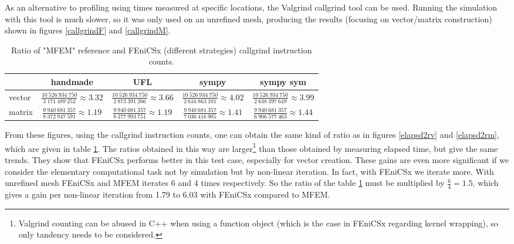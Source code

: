\documentclass[12pt]{article}
\newcommand{\f}[1]{FEniCSx#1}
\begin{document}
\bigskip	
As an alternative to profiling using times measured at specific locations, the Valgrind callgrind tool can be used.
Running the simulation with this tool is much slower, so it was only used on an unrefined mesh, producing the results (focusing on vector/matrix construction) shown in figures \ref{callgrindF} and \ref{callgrindM}.
\begin{table}[h]
	\begin{tabular}{c|c|c|c|c|}
		\cline{2-5}
		& handmade & UFL & sympy & sympy sym \\ \hline
		\multicolumn{1}{|l|}{vector} & \footnotesize $\frac{10~526~934~750}{3~171~489~252}\approx3.32$ & \footnotesize $\frac{10~526~934~750}{2~873~391~266}\approx3.66$ & \footnotesize $\frac{10~526~934~750}{2~616~863~101}\approx4.02$ & \footnotesize $\frac{10~526~934~750}{2~638~397~649}\approx3.99$  \\ \hline
		\multicolumn{1}{|c|}{matrix} & \footnotesize $\frac{9~940~681~357}{8~372~947~591}\approx1.19$ & \footnotesize $\frac{9~940~681~357}{8~377~993~751}\approx1.19$ & \footnotesize $\frac{9~940~681~357}{7~036~416~905}\approx1.41$ & \footnotesize
		$\frac{9~940~681~357}{6~906~577~463}\approx1.44$ \\ \hline
	\end{tabular}
	\caption{Ratio of "{\color{MFEMGreen}MFEM}" reference and \f{} (different strategies) callgrind instruction counts.\label{callgrindratioex1}}
\end{table}
From these figures,  using the callgrind instruction counts, one can obtain the same kind of ratio as in figures \ref{elapsd2rv} and \ref{elapsd2rm}, which are given in table \ref{callgrindratioex1}.
The ratios obtained in this way are larger\footnote{Valgrind counting can be abused in C++ when using a function object (which is the case in \f{} regarding kernel wrapping), so only tandency needs to be considered.} than those obtained by measuring elapsed time, but give the same trends.
They show that \f{} performs better in this test case, especially for vector creation. These gains are even more significant if we consider the elementary computational task not by simulation but by non-linear iteration.
In fact, with \f{} we iterate more.
With unrefined mesh \f{} and MFEM iterates 6 and 4 times respectively.
So the ratio of the table \ref{callgrindratioex1} must be multiplied by $\frac{6}{4}=1.5$, which gives a gain per non-linear iteration from 1.79 to 6.03 with \f{} compared to MFEM.
\end{document}
